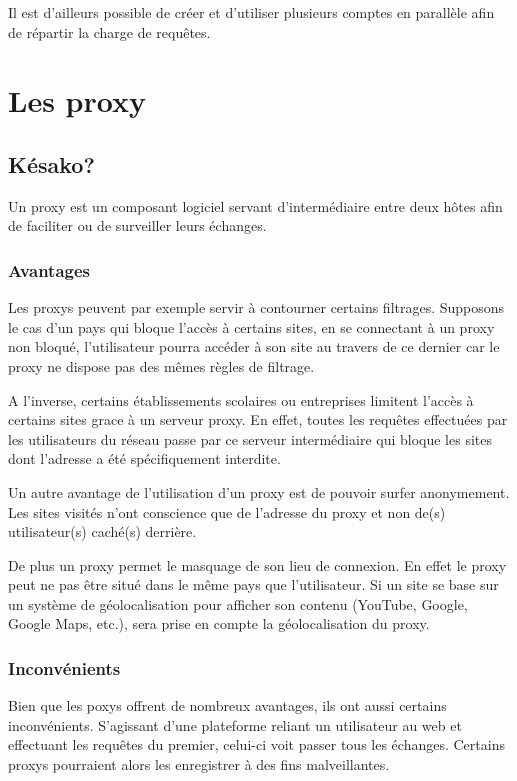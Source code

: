 \documentclass[hideweeklyreports,noposter]{polytech/polytech}
\begin{document}
			Il est d'ailleurs possible de créer et d'utiliser plusieurs comptes en parallèle afin de répartir la charge de requêtes.

	\chapter{Les proxy\label{sec:proxys}}
		\section{Késako?}
			Un proxy est un composant logiciel servant d'intermédiaire entre deux hôtes afin de faciliter ou de surveiller leurs échanges.
			
			
			\subsection{Avantages}
				Les proxys peuvent par exemple servir à contourner certains filtrages.
				Supposons le cas d'un pays qui bloque l'accès à certains sites, en se connectant à un proxy non bloqué, l'utilisateur pourra accéder à son site au travers de ce dernier car le proxy ne dispose pas des mêmes règles de filtrage.
				
				A l'inverse, certains établissements scolaires ou entreprises limitent l'accès à certains sites grace à un serveur proxy. En effet, toutes les requêtes effectuées par les utilisateurs du réseau passe par ce serveur intermédiaire qui bloque les sites dont l'adresse a été spécifiquement interdite.
				
				Un autre avantage de l'utilisation d'un proxy est de pouvoir surfer anonymement. Les sites visités n'ont conscience que de l'adresse du proxy et non de(s) utilisateur(s) caché(s) derrière.
				
				De plus un proxy permet le masquage de son lieu de connexion. En effet le proxy peut ne pas être situé dans le même pays que l'utilisateur.
				Si un site se base sur un système de géolocalisation pour afficher son contenu (YouTube, Google, Google Maps, etc.), sera prise en compte la géolocalisation du proxy.
				
			\subsection{Inconvénients}
				Bien que les poxys offrent de nombreux avantages, ils ont aussi certains inconvénients.
				S'agissant d'une plateforme reliant un utilisateur au web et effectuant les requêtes du premier, celui-ci voit passer tous les échanges.
				Certains proxys pourraient alors les enregistrer à des fins malveillantes.
				
\end{document}
